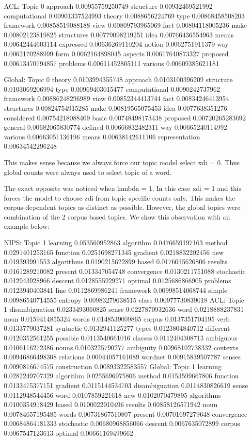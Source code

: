 \documentclass{article}
\begin{document}
ACL:
Topic 0
approach 0.00955759250749
structure 0.00932469521992
computational 0.00901337524993
theory 0.0088656224769
type 0.00868458508203
framework 0.00858519088188
view 0.00809793965069
fact 0.00804118005236
make 0.00802123819825
structures 0.00779098219251
idea 0.00766436554963
means 0.00642444603114
expressed 0.00636269110204
notion 0.0062751911379
way 0.0062170288999
form 0.0062164898045
aspects 0.00617640873327
proposed 0.00613470794857
problems 0.00611452805111
various 0.00609385621181

Global:
Topic 0
theory 0.0103994355748
approach 0.0103100396209
structure 0.0103069206994
type 0.00969403015477
computational 0.0090242737962
framework 0.00886248296989
view 0.00852344413744
fact 0.00834246413954
structures 0.00824754915285
make 0.00819565075453
idea 0.0077638351276
considered 0.00754218088409
basic 0.00748498173438
proposed 0.00720265283692
general 0.00682065830774
defined 0.00666832482311
way 0.00665240114992
various 0.00663051136196
means 0.00638142611106
representation 0.00634542296248

This makes sense because we always force our topic model select xdi = 0. Thus global counts were always used to select topic of a word.

The exact opposite was noticed when lambda = 1. In this case xdi = 1 and this forces the model to choose zdi from topic specific counts only. This makes the corpus-dependent topics as distinct as possible. However, the global topics were combination of the 2 corpus based topics. We show this observation with an example below:

NIPS:
Topic 1
learning 0.053560952863
algorithm 0.0476659197163
method 0.0291401253165
function 0.0251698271345
gradient 0.0218832202456
new 0.019393991553
algorithms 0.0190215622899
based 0.0176015626806
results 0.0161289210082
present 0.013347054748
convergence 0.0130211751088
stochastic 0.012943928966
descent 0.0128555929271
optimal 0.0125686866905
problems 0.0123940403841
line 0.0112869986241
framework 0.00998514068744
simple 0.00986540714555
entropy 0.00983279638515
class 0.00977730839018
ACL:
Topic 1
disambiguation 0.0233493060825
sense 0.0227870932636
word 0.0218888237831
noun 0.0159414855324
words 0.0148539009865
corpus 0.0137351704195
verb 0.0133779037281
syntactic 0.0132941125277
types 0.0123804840712
different 0.0120352561255
possible 0.0113540661016
classes 0.0112404308713
ambiguous 0.0106116272386
nouns 0.0103225790277
ambiguity 0.00968102738332
contexts 0.00946866498308
relations 0.00944057161089
wordnet 0.00915839507787
senses 0.0090816674575
construction 0.00893322583557
Global:
Topic 1
learning 0.0282249707329
algorithm 0.0255696975806
method 0.0153599667806
function 0.0133475377151
gradient 0.0115144534703
disambiguation 0.0114830826619
sense 0.0112948544456
word 0.0107859221618
new 0.0102070479895
algorithms 0.0100354918429
based 0.0100022010496
results 0.00858126571942
noun 0.00784657195485
words 0.00731867510807
present 0.00701697279648
convergence 0.00684864181333
stochastic 0.00680968856066
descent 0.0067635072899
corpus 0.0067547123613
optimal 0.00661169499662
\end{document}
